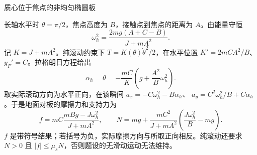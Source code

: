 \begin{practicebox}{质心位于焦点的非均匀椭圆板}
\begin{solution}
长轴水平时 $\theta=\pi/2$，焦点高度为 $B$，接触点到焦点的距离为 $A$。由能量守恒
\begin{equation}
 \boxed{\omega_h^2=\frac{2mg(A+C-B)}{J+mA^2}}.
 \label{r2ch06:eq:041}
\end{equation}
记 $K=J+mA^2$。纯滚动约束下 $T=K(\theta)\dot\theta^2/2$，在水平位置
$K'=2mCA^2/B$、$y_F'=C$。拉格朗日方程给出
\begin{equation}
 \boxed{\alpha_h=\ddot\theta
 =-\frac{mC}{K}\left(g+\frac{A^2}{B}\omega_h^2\right)}.
 \label{r2ch06:eq:042}
\end{equation}
取实际滚动方向为水平正向，在该瞬间
$a_x=-C\omega_h^2-B\alpha_h$、
$a_y=C^2\omega_h^2/B+C\alpha_h$。于是地面对板的摩擦力和支持力为
\begin{equation}
 \boxed{f=mC\frac{mBg-J\omega_h^2}{J+mA^2}},
 \qquad
 \boxed{N=mg+\frac{mC^2}{J+mA^2}
 \left(\frac{J\omega_h^2}{B}-mg\right)}.
 \label{r2ch06:eq:043}
\end{equation}
$f$ 是带符号结果；若括号为负，实际摩擦方向与所取正向相反。纯滚动还要求 $N>0$ 且 $|f|\le\mu_sN$，否则题设的无滑动运动无法维持。
\figEllipseRoll
\end{solution}
\end{practicebox}
